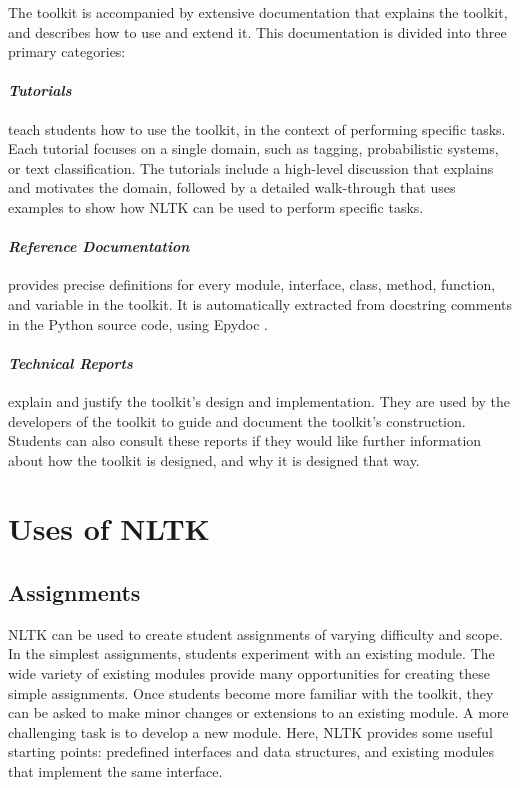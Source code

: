 \documentclass[11pt]{article}
\begin{document}
The toolkit is accompanied by extensive documentation that explains
the toolkit, and describes how to use and extend it.  This
documentation is divided into three primary categories:

\paragraph{\textit{Tutorials}} teach students how to use the toolkit,
in the context of performing specific tasks.  Each tutorial focuses on
a single domain, such as tagging, probabilistic systems, or text
classification.  The tutorials include a high-level discussion that
explains and motivates the domain, followed by a detailed
walk-through that uses examples to show how NLTK can be used to
perform specific tasks.

\paragraph{\textit{Reference Documentation}} provides precise
definitions for every module, interface, class, method, function, and
variable in the toolkit.  It is automatically extracted from docstring
comments in the Python source code, using Epydoc \cite{epydoc}.

\paragraph{\textit{Technical Reports}} explain and justify the
toolkit's design and implementation.  They are used by the developers
of the toolkit to guide and document the toolkit's construction.
Students can also consult these reports if they would like further
information about how the toolkit is designed, and why it is designed
that way.

\section{Uses of NLTK}
\label{sec:uses}

\subsection{Assignments}

NLTK can be used to create student assignments of varying difficulty
and scope.  
In the simplest assignments, students experiment with an existing
module.  The wide variety of existing modules provide many opportunities
for creating these simple assignments.
Once students become more familiar with the toolkit, they can be asked
to make minor changes or extensions to an existing module.
A more challenging task is to develop a new module.  Here, NLTK
provides some useful starting points: predefined interfaces and data
structures, and existing modules that implement the same interface.
\end{document}
